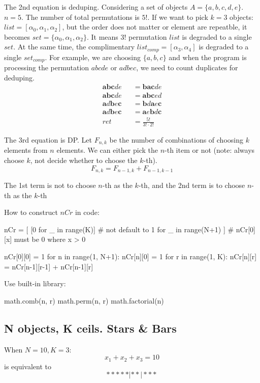 The 2nd equation is deduping. Considering a set of objects $A = \{a, b, c, d, e\}$. $n = 5$. The number of total permutations is $5!$. If we want to pick $k=3$ objects: $list = [\alpha_0, \alpha_1, \alpha_2]$, but the order does not matter or element are repeatble, it becomes $set = \{\alpha_0, \alpha_1, \alpha_2\}$. It means $3!$ permutation $list$ is degraded to a single $set$. At the same time, the complimentary $list_{comp} = [\alpha_3, \alpha_4]$ is degraded to a single $set_{comp}$. For example, we are choosing $\{a, b, c\}$ and when the program is processing the permutation $abcde$ or $adbec$, we need to count duplicates for deduping. 
\begin{eqnarray*}
\mathbf{abc}de &&= \mathbf{bac}de \\
\mathbf{abc}de && = \mathbf{abc}ed \\
\mathbf{a}d\mathbf{b}e\mathbf{c} &&= \mathbf{b}d\mathbf{a}e\mathbf{c} \\
\mathbf{a}d\mathbf{b}e\mathbf{c} && = \mathbf{a}e\mathbf{b}d\mathbf{c} \\
ret &&= \frac{5!}{3! \cdot 2!}
\end{eqnarray*}

The 3rd equation is DP. Let $F_{n, k}$ be the number of combinations of choosing $k$ elements from $n$ elements. We can either pick the $n$-th item or not (note: always choose $k$, not decide whether to choose the $k$-th). 
$$
F_{n,k} = F_{n-1, k} + F_{n-1, k-1}
$$

The 1st term is not to choose $n$-th as the $k$-th, and the 2nd term is to choose $n$-th as the $k$-th

How to construct $nCr$ in code:
\begin{python}
nCr = [
    [0 for _ in range(K)]  # not default to 1
    for _ in range(N+1)
]
# nCr[0][x] must be 0 where x > 0

nCr[0][0] = 1
for n in range(1, N+1):
    nCr[n][0] = 1
    for r in range(1, K):
        nCr[n][r] = nCr[n-1][r-1] + nCr[n-1][r]
\end{python}

Use built-in library: 
\begin{python}
math.comb(n, r)
math.perm(n, r)
math.factorial(n)
\end{python}

\subsection{N objects, K ceils. Stars \& Bars}
When $N=10, K=3$:
$$
x_1 + x_2 + x_3 = 10
$$
is equivalent to
$$
*****|**|***
$$

